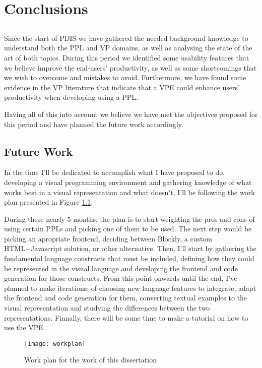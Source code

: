 \chapter{Conclusions} \label{chap:concl}

\section*{}

Since the start of PDIS we have gathered the needed background knowledge to
understand both the PPL and VP domains, as well as analysing the state of the art
of both topics. During this period we identified some usability features that
we believe improve the end-users' productivity, as well as some shortcomings
that we wish to overcome and mistakes to avoid. Furthermore, we have found some
evidence in the VP literature
that indicate that a VPE could enhance users' productivity when developing using
a PPL.

Having all of this into account we believe we have met the objectives proposed for
this period and have planned the future work accordingly.

\section{Future Work}

In the time I'll be dedicated to accomplish what I have proposed to do, developing
a visual programming environment and gathering knowledge of what works best in
a visual representation and what doesn't, I'll be following the work plan presented
in Figure \ref{fig:workplan}.

During these nearly 5 months, the plan is to start weighting the pros and cons
of using certain PPLs and picking one of them to be used. The next step would be
picking an apropriate frontend, deciding between Blockly, a custom HTML+Javascript
solution, or other alternative. Then, I'll start by gathering the fundamental
language constructs that must be included, defining how they could be represented
in the visual language and developing the frontend and code generation for those constructs.
From this point onwards until the end, I've planned to make iterations: of choosing
new language features to integrate, adapt the frontend and code generation for them,
converting textual examples to the visual representation and studying the differences
between the two representations. Finnally, there
will be some time to make a tutorial on how to use the VPE.

\begin{figure}[t]
  \begin{center}
    \leavevmode
    \texttt{[image: workplan]}
    \caption{Work plan for the work of this dissertation}
    \label{fig:workplan}
  \end{center}
\end{figure}
